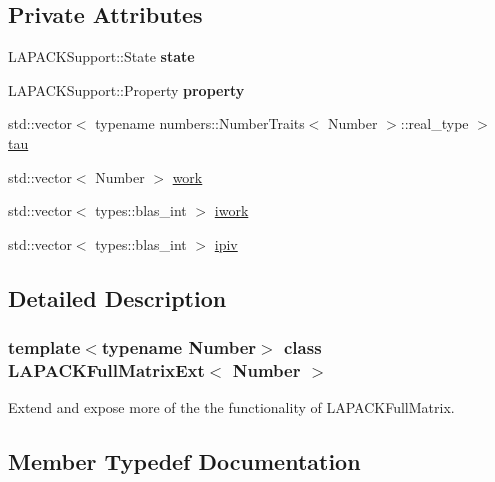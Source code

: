 \subsection*{Private Attributes}
\begin{DoxyCompactItemize}
\item 
\mbox{\label{classLAPACKFullMatrixExt_adec2cd643cd2bf3d66293f43e72af687}} 
L\+A\+P\+A\+C\+K\+Support\+::\+State {\bfseries state}
\item 
\mbox{\label{classLAPACKFullMatrixExt_a17c0100c66b9c4be46b87cbceea1be6d}} 
L\+A\+P\+A\+C\+K\+Support\+::\+Property {\bfseries property}
\item 
std\+::vector$<$ typename numbers\+::\+Number\+Traits$<$ Number $>$\+::real\+\_\+type $>$ \hyperlink{classLAPACKFullMatrixExt_a91fb784892cbe9d24ad2062fbf642635}{tau}
\item 
std\+::vector$<$ Number $>$ \hyperlink{classLAPACKFullMatrixExt_a971d29c6d7664fca553b6ba377519946}{work}
\item 
std\+::vector$<$ types\+::blas\+\_\+int $>$ \hyperlink{classLAPACKFullMatrixExt_ac091f1f6af485b451c4c9398abb67230}{iwork}
\item 
std\+::vector$<$ types\+::blas\+\_\+int $>$ \hyperlink{classLAPACKFullMatrixExt_a436d7290d5b2b17c0691b5b63cca36fa}{ipiv}
\end{DoxyCompactItemize}


\subsection{Detailed Description}
\subsubsection*{template$<$typename Number$>$\newline
class L\+A\+P\+A\+C\+K\+Full\+Matrix\+Ext$<$ Number $>$}

Extend and expose more of the the functionality of L\+A\+P\+A\+C\+K\+Full\+Matrix. 

\subsection{Member Typedef Documentation}
\mbox{\label{classLAPACKFullMatrixExt_a5cf5f4a6104dc17029210b5ca52bf574}} 
